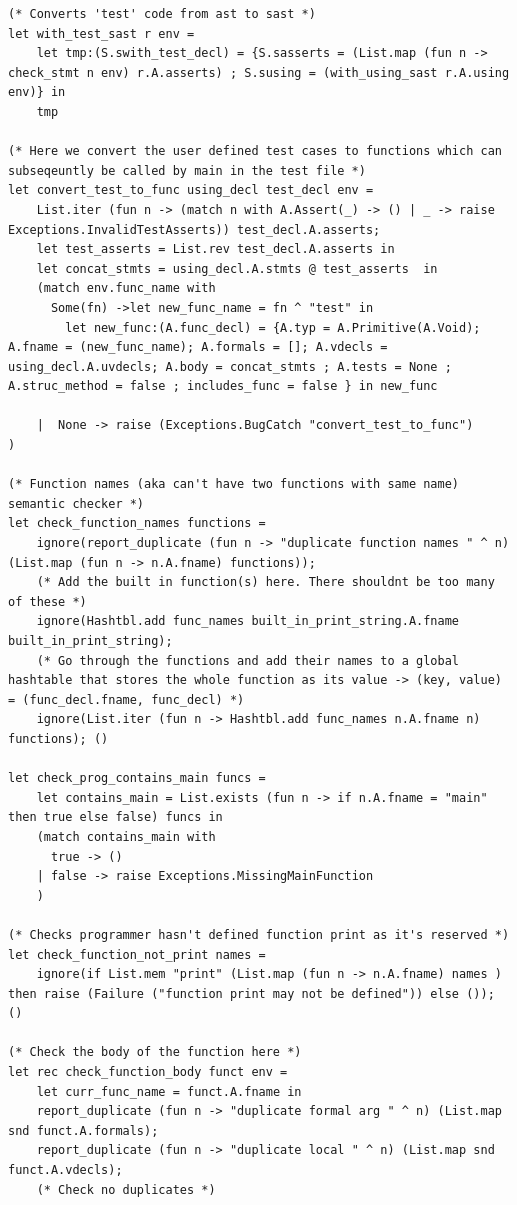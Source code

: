 \documentclass{article}
\begin{document}
\begin{lstlisting}
(* Converts 'test' code from ast to sast *)
let with_test_sast r env =
	let tmp:(S.swith_test_decl) = {S.sasserts = (List.map (fun n -> check_stmt n env) r.A.asserts) ; S.susing = (with_using_sast r.A.using env)} in
	tmp 

(* Here we convert the user defined test cases to functions which can subseqeuntly be called by main in the test file *)
let convert_test_to_func using_decl test_decl env = 
	List.iter (fun n -> (match n with A.Assert(_) -> () | _ -> raise Exceptions.InvalidTestAsserts)) test_decl.A.asserts;
	let test_asserts = List.rev test_decl.A.asserts in
	let concat_stmts = using_decl.A.stmts @ test_asserts  in
	(match env.func_name with
	  Some(fn) ->let new_func_name = fn ^ "test" in  
		let new_func:(A.func_decl) = {A.typ = A.Primitive(A.Void); A.fname = (new_func_name); A.formals = []; A.vdecls =  using_decl.A.uvdecls; A.body = concat_stmts ; A.tests = None ; A.struc_method = false ; includes_func = false } in new_func

	|  None -> raise (Exceptions.BugCatch "convert_test_to_func")
)

(* Function names (aka can't have two functions with same name) semantic checker *)
let check_function_names functions = 
	ignore(report_duplicate (fun n -> "duplicate function names " ^ n) (List.map (fun n -> n.A.fname) functions));	
	(* Add the built in function(s) here. There shouldnt be too many of these *)
	ignore(Hashtbl.add func_names built_in_print_string.A.fname built_in_print_string);
	(* Go through the functions and add their names to a global hashtable that stores the whole function as its value -> (key, value) = (func_decl.fname, func_decl) *)
	ignore(List.iter (fun n -> Hashtbl.add func_names n.A.fname n) functions); ()

let check_prog_contains_main funcs =
	let contains_main = List.exists (fun n -> if n.A.fname = "main" then true else false) funcs in
	(match contains_main with
	  true -> ()
	| false -> raise Exceptions.MissingMainFunction
	)

(* Checks programmer hasn't defined function print as it's reserved *)
let check_function_not_print names = 
	ignore(if List.mem "print" (List.map (fun n -> n.A.fname) names ) then raise (Failure ("function print may not be defined")) else ()); ()

(* Check the body of the function here *)
let rec check_function_body funct env =
	let curr_func_name = funct.A.fname in
	report_duplicate (fun n -> "duplicate formal arg " ^ n) (List.map snd funct.A.formals);
	report_duplicate (fun n -> "duplicate local " ^ n) (List.map snd funct.A.vdecls);
	(* Check no duplicates *)


\end{lstlisting}
\end{document}
